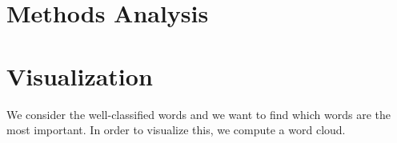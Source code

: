 \documentclass[11pt,twocolumn]{report}
\begin{document}
\section *{Methods Analysis}

\section*{Visualization}
    We consider the well-classified words and we want to find which words are the most important. In order to visualize this, we compute a word cloud. 
    
%    
\end{document}
